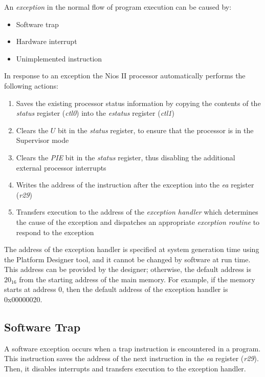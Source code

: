 \documentclass[11pt, twoside, pdftex]{article}
\begin{document}
An {\it exception} in the normal flow of program execution can be caused by:
\begin{itemize}
\item Software trap
\item Hardware interrupt
\item Unimplemented instruction
\end{itemize}
\noindent
In response to an exception the Nios II processor automatically performs the following actions:
\begin{enumerate}
\item Saves the existing processor status information by copying the contents
of the {\it status} register ({\it ctl0}) into the {\it estatus} register ({\it ctl1})

\item Clears the $U$ bit in the {\it status} register, to ensure that the processor
is in the Supervisor mode

\item Clears the {\it PIE} bit in the {\it status} register, thus disabling the
additional external processor interrupts

\item Writes the address of the instruction after the exception into the {\it ea}
register ({\it r29})

\item Transfers execution to the address of the {\it exception handler} which
determines the cause of the exception and dispatches an appropriate
{\it exception routine} to respond to the exception
\end{enumerate}
\noindent
The address of the exception handler is specified at system generation time
using the Platform Designer tool,
and it cannot be changed by software at run time. 
This address can be provided by the designer; otherwise, the default address is
$20_{16}$ from the starting address of the main memory. For example, if the 
memory starts at address 0, then the default address of the exception handler
is 0x00000020.

\subsection{Software Trap}

A software exception occurs when a {\sf trap} instruction is encountered in 
a program. This instruction saves the address of the next instruction in the
{\it ea} register ({\it r29}). Then, it disables interrupts and transfers
execution to the exception handler.
\end{document}
